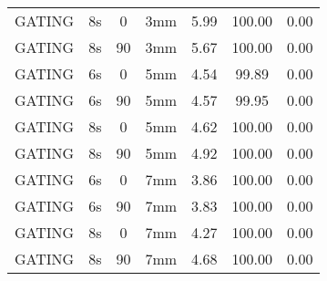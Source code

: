 \begin{table}[H]
\begin{tabular}{|c||c|c|c||c|c|c|}
GATING & 8s & 0 & 3mm & 5.99 & 100.00 & 0.00 \\
GATING & 8s & 90 & 3mm & 5.67 & 100.00 & 0.00 \\
GATING & 6s & 0 & 5mm & 4.54 & 99.89 & 0.00 \\
GATING & 6s & 90 & 5mm & 4.57 & 99.95 & 0.00 \\
GATING & 8s & 0 & 5mm & 4.62 & 100.00 & 0.00 \\
GATING & 8s & 90 & 5mm & 4.92 & 100.00 & 0.00 \\
GATING & 6s & 0 & 7mm & 3.86 & 100.00 & 0.00 \\
GATING & 6s & 90 & 7mm & 3.83 & 100.00 & 0.00 \\
GATING & 8s & 0 & 7mm & 4.27 & 100.00 & 0.00 \\
GATING & 8s & 90 & 7mm & 4.68 & 100.00 & 0.00 \\
    \hline\hline 
  \end{tabular}
\end{table}

\newpage

